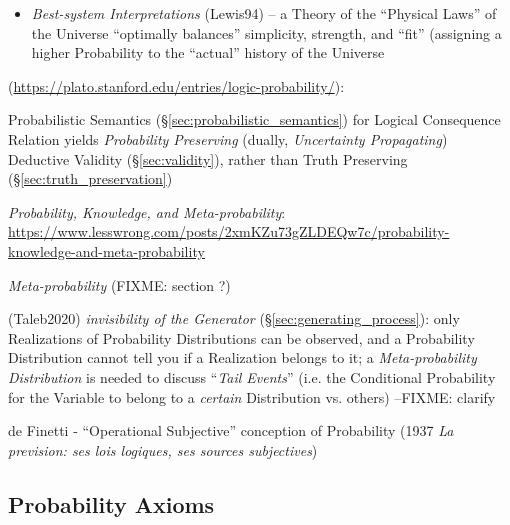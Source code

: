 \begin{itemize}
    of such an Outcome; motivated by ``single-case'' Probability attributions
    (e.g. radioactive decay); distinction between \emph{long-run} and
    \emph{single-case} Propensities (Gillies00); \emph{Humphreys' Paradox}:
    Propensities as measures of ``causal tendencies'' violates Bayes' Theorem
    which allows the reversal of a Conditional Probability-- cf. alternative
    ``Probabilistic Causal Calculus'' (Fetzer81)
  \item \emph{Best-system Interpretations} (Lewis94) -- a Theory of the
    ``Physical Laws'' of the Universe ``optimally balances'' simplicity,
    strength, and ``fit'' (assigning a higher Probability to the ``actual''
    history of the Universe
\end{itemize}

(\url{https://plato.stanford.edu/entries/logic-probability/}):

Probabilistic Semantics (\S\ref{sec:probabilistic_semantics}) for Logical
Consequence Relation yields \emph{Probability Preserving} (dually,
\emph{Uncertainty Propagating}) Deductive Validity (\S\ref{sec:validity}),
rather than Truth Preserving (\S\ref{sec:truth_preservation})

\emph{Probability, Knowledge, and Meta-probability}:
\url{https://www.lesswrong.com/posts/2xmKZu73gZLDEQw7c/probability-knowledge-and-meta-probability}

\asterism

\emph{Meta-probability} (FIXME: section ?)

(Taleb2020) \emph{invisibility of the Generator}
(\S\ref{sec:generating_process}): only Realizations of Probability Distributions
can be observed, and a Probability Distribution cannot tell you if a Realization
belongs to it; a \emph{Meta-probability Distribution} is needed to discuss
``\emph{Tail Events}'' (i.e. the Conditional Probability for the Variable to
belong to a \emph{certain} Distribution vs. others) --FIXME: clarify

\asterism

de Finetti - ``Operational Subjective'' conception of Probability
(1937 \emph{La prevision: ses lois logiques, ses sources subjectives})



\subsection{Probability Axioms}\label{sec:probability_axioms}

